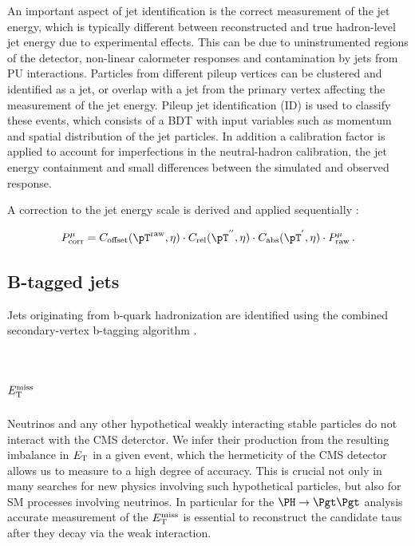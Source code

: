 An important aspect of jet identification is the correct measurement of the jet
energy, which is typically different between reconstructed and true hadron-level jet energy
due to experimental effects. This can be due to uninstrumented regions of the
detector, non-linear calormeter responses and contamination by jets from \ac{PU}
interactions. Particles from different pileup vertices can be clustered and identified as a
jet, or overlap with a jet from the primary vertex affecting the measurement of the jet energy.
Pileup jet identification (ID) is used to classify these events, which consists
of a \ac{BDT} \cite{TMVA} with input variables such as
momentum and spatial distribution of the jet particles. In addition
a calibration factor is applied to account for imperfections in the
neutral-hadron calibration, the jet energy containment and small differences
between the simulated and observed response.

A correction to the jet energy scale is derived and applied sequentially
\cite{CMS-JME-10-011}:

\begin{equation}
P_{\text{corr}}^{\mu} = C_{\text{offset}}(\pT^{\text{raw}},\eta) \cdot
C_{\text{rel}}(\pT^{''},\eta) \cdot C_{\text{abs}}(\pT^{'},\eta) \cdot
P_{\text{raw}}^{\mu}\, .
\end{equation}

\subsection{B-tagged jets}
\label{sec:btag}

Jets originating from b-quark
hadronization are identified using the combined secondary-vertex b-tagging
algorithm \cite{bjets}.

\section{$E_{\mathrm{T}}^{\text{miss}}$}
\label{sec:met}

Neutrinos and any other hypothetical weakly interacting stable particles do not
interact with the CMS deterctor. We infer their production from the resulting
imbalance in $E_{\mathrm{T}}$ in a given event, which the hermeticity of the CMS detector
allows us to measure to a high degree of accuracy. This is crucial not only in
many searches for new physics involving such hypothetical particles, but also for
\ac{SM} processes involving neutrinos. In particular for the $\PH \to \Pgt\Pgt$
analysis accurate measurement of the $E_{\mathrm{T}}^{\text{miss}}$ is essential to reconstruct the
candidate taus after they decay via the weak interaction.

